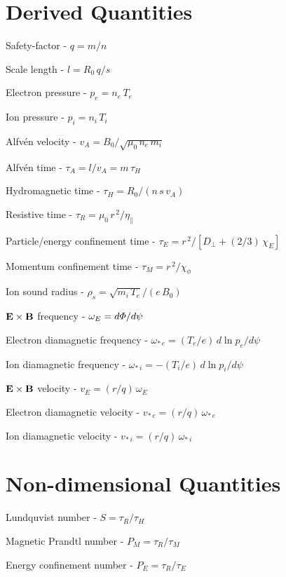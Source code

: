 \documentclass[12pt]{article}
\begin{document}
\section{Derived Quantities}
\begin{description}
\item Safety-factor - $q=m/n$
\item Scale length - $l = R_0\,q/s$ 
\item Electron pressure - $p_e = n_e\,T_e$
\item Ion pressure - $p_i = n_i\,T_i$
\item Alfv\'{e}n velocity - $v_A = B_0/\sqrt{\mu_0\,n_e\,m_i}$
\item Alfv\'{e}n time - $\tau_A= l/v_A =m\,\tau_H$
\item Hydromagnetic time - $\tau_H =R_0/(n\,s\,v_A)$
\item Resistive time - $\tau_R = \mu_0\,r^{\,2}/\eta_\parallel$
\item Particle/energy confinement time - $\tau_E= r^{\,2}/[D_\perp + (2/3)\,\chi_E]$
\item Momentum confinement time - $\tau_M = r^{\,2}/\chi_\phi$
\item Ion sound radius - $\rho_s = \sqrt{m_i\,T_e}/(e\,B_0)$
\item ${\bf E}\times {\bf B}$ frequency - $\omega_E = d{\mit\Phi}/d\psi$
\item Electron diamagnetic frequency - $\omega_{\ast\,e} = (T_e/e)\,d\ln p_e/d\psi$
\item Ion diamagnetic frequency - $\omega_{\ast\,i} =- (T_i/e)\,d\ln p_i/d\psi$
\item ${\bf E}\times {\bf B}$ velocity - $v_E = (r/q)\,\omega_E$
\item Electron diamagnetic velocity -  $v_{\ast\,e} = (r/q)\,\omega_{\ast\,e}$
\item Ion diamagnetic velocity -  $v_{\ast\,i} = (r/q)\,\omega_{\ast\,i}$
\end{description}

\section{Non-dimensional Quantities}
\begin{description}
\item Lundquvist number - $S=\tau_R/\tau_H$
\item Magnetic Prandtl number - $P_M = \tau_R/\tau_M$
\item Energy confinement number - $P_E = \tau_R/\tau_E$
\end{description}
\end{document}
